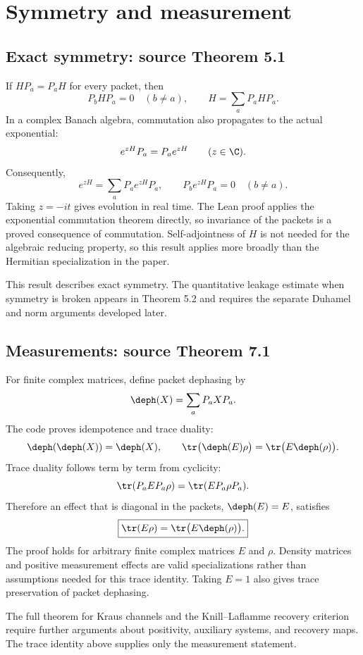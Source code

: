 \section{Symmetry and measurement}\label{supp1:section:002}
\subsection{Exact symmetry: source Theorem 5.1}
If $HP_a=P_aH$ for every packet, then
\[
P_bHP_a=0\quad(b\ne a),\qquad H=\sum_aP_aHP_a.
\]
In a complex Banach algebra, commutation also propagates to the actual exponential:
\[
e^{zH}P_a=P_ae^{zH}\qquad(z\in\C).
\]
Consequently,
\[
e^{zH}=\sum_aP_ae^{zH}P_a,
\qquad P_be^{zH}P_a=0\quad(b\ne a).
\]
Taking $z=-it$ gives evolution in real time. The Lean proof applies the exponential commutation theorem directly, so invariance of the packets is a proved consequence of commutation. Self-adjointness of $H$ is not needed for the algebraic reducing property, so this result applies more broadly than the Hermitian specialization in the paper.



This result describes exact symmetry. The quantitative leakage estimate when symmetry is broken appears in Theorem 5.2 and requires the separate Duhamel and norm arguments developed later.

\subsection{Measurements: source Theorem 7.1}
For finite complex matrices, define packet dephasing by
\[
\deph(X)=\sum_aP_aXP_a.
\]
The code proves idempotence and trace duality:
\[
\deph(\deph(X))=\deph(X),\qquad
\tr\bigl(\deph(E)\rho\bigr)=\tr\bigl(E\deph(\rho)\bigr).
\]
Trace duality follows term by term from cyclicity:
\[
\tr(P_aEP_a\rho)=\tr(EP_a\rho P_a).
\]
Therefore an effect that is diagonal in the packets, $\deph(E)=E$, satisfies
\[
\boxed{\tr(E\rho)=\tr\bigl(E\deph(\rho)\bigr).}
\]
The proof holds for arbitrary finite complex matrices $E$ and $\rho$. Density matrices and positive measurement effects are valid specializations rather than assumptions needed for this trace identity. Taking $E=1$ also gives trace preservation of packet dephasing.



The full theorem for Kraus channels and the Knill--Laflamme recovery criterion require further arguments about positivity, auxiliary systems, and recovery maps. The trace identity above supplies only the measurement statement.



